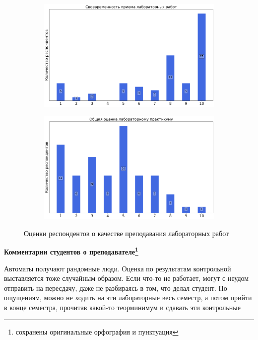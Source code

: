 \begin{figure}[H]
\begin{subfigure}[b]{0.45\textwidth}
				\includegraphics[width=\textwidth]{images/3 course/Лаборатория инфокоммуникационных технологий/labniks-marks-Лилеин А.Л-2.png}
			\end{subfigure}
			\begin{subfigure}[b]{0.45\textwidth}
				\centering
				\includegraphics[width=\textwidth]{images/3 course/Лаборатория инфокоммуникационных технологий/labniks-marks-Лилеин А.Л-3.png}
			\end{subfigure}	
			\caption{Оценки респондентов о качестве преподавания лабораторных работ}
		\end{figure}

		\textbf{Комментарии студентов о преподавателе\protect\footnote{сохранены оригинальные орфография и пунктуация}}
            \begin{commentbox} 
                Автоматы получают рандомные люди. Оценка по результатам контрольной выставляется тоже случайным образом. Если что-то не работает, могут с неудом отправить на пересдачу, даже не разбираясь в том, что делал студент. По ощущениям, можно не ходить на эти лабораторные весь семестр, а потом прийти в конце семестра, прочитав какой-то теорминимум и сдавать эти контрольные 
            \end{commentbox} 
       
